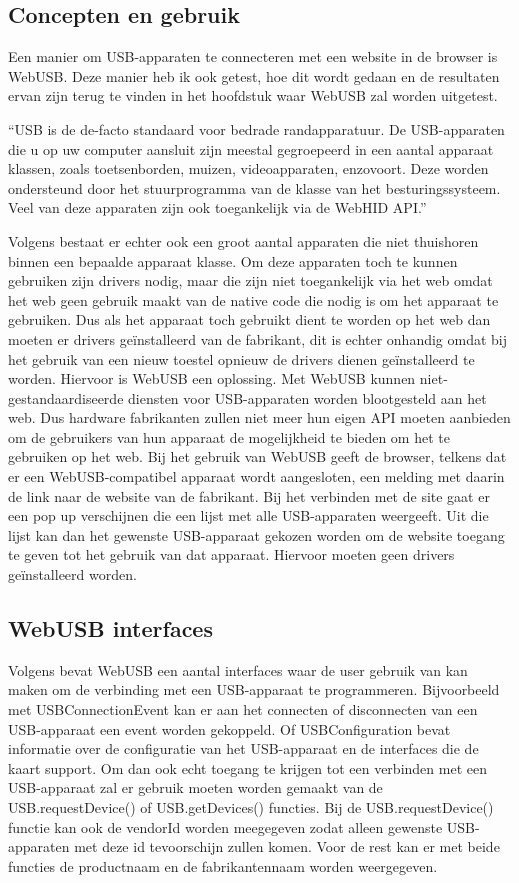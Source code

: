 \subsection{Concepten en gebruik}
Een manier om USB-apparaten te connecteren met een website in de browser is WebUSB. Deze manier heb ik ook getest, hoe dit wordt gedaan en de resultaten ervan zijn terug te vinden in het hoofdstuk waar WebUSB zal worden uitgetest.

``USB is de de-facto standaard voor bedrade randapparatuur. De USB-apparaten die u op uw computer aansluit zijn meestal gegroepeerd in een aantal apparaat klassen, zoals toetsenborden, muizen, videoapparaten, enzovoort. Deze worden ondersteund door het stuurprogramma van de klasse van het besturingssysteem. Veel van deze apparaten zijn ook toegankelijk via de WebHID API.''\autocite{DevMozWebUSB}

Volgens \textcite{DevMozWebUSB} bestaat er echter ook een groot aantal apparaten die niet thuishoren binnen een bepaalde apparaat klasse. Om deze apparaten toch te kunnen gebruiken zijn drivers nodig, maar die zijn niet toegankelijk via het web omdat het web geen gebruik maakt van de native code die nodig is om het apparaat te gebruiken. Dus als het apparaat toch gebruikt dient te worden op het web dan moeten er drivers geïnstalleerd van de fabrikant, dit is echter onhandig omdat bij het gebruik van een nieuw toestel opnieuw de drivers dienen geïnstalleerd te worden. 
Hiervoor is WebUSB een oplossing. Met WebUSB kunnen niet-gestandaardiseerde diensten voor USB-apparaten worden blootgesteld aan het web. Dus hardware fabrikanten zullen niet meer hun eigen API moeten aanbieden om de gebruikers van hun apparaat de mogelijkheid te bieden om het te gebruiken op het web. 
Bij het gebruik van WebUSB geeft de browser, telkens dat er een WebUSB-compatibel apparaat wordt aangesloten, een melding met daarin de link naar de website van de fabrikant. Bij het verbinden met de site gaat er een pop up verschijnen die een lijst met alle USB-apparaten weergeeft. Uit die lijst kan dan het gewenste USB-apparaat gekozen worden om de website toegang te geven tot het gebruik van dat apparaat. Hiervoor moeten geen drivers geïnstalleerd worden. 

\subsection{WebUSB interfaces}
Volgens \textcite{DevMozWebUSB} bevat WebUSB een aantal interfaces waar de user gebruik van kan maken om de verbinding met een USB-apparaat te programmeren. Bijvoorbeeld met USBConnectionEvent kan er aan het connecten of disconnecten van een USB-apparaat een event worden gekoppeld. Of USBConfiguration bevat informatie over de configuratie van het USB-apparaat en de interfaces die de kaart support.
Om dan ook echt toegang te krijgen tot een verbinden met een USB-apparaat zal er gebruik moeten worden gemaakt van de USB.requestDevice() of USB.getDevices() functies. Bij de USB.requestDevice() functie kan ook de vendorId worden meegegeven zodat alleen gewenste USB-apparaten met deze id tevoorschijn zullen komen. Voor de rest kan er met beide functies de productnaam en de fabrikantennaam worden weergegeven.




